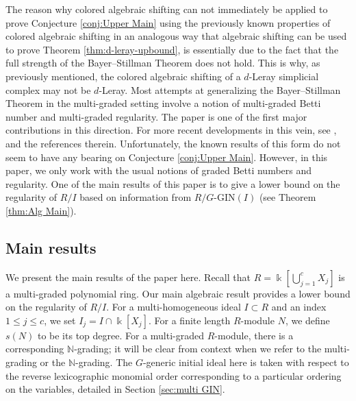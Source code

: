 \documentclass[a4paper, 10pt, reqno, english, ones]{amsart}  %
\theoremstyle{definition}
\theoremstyle{remark}
\begin{document}
The reason why colored algebraic shifting can not immediately be applied to prove Conjecture \ref{conj:Upper Main} using the previously known properties of colored algebraic shifting in an analogous way that algebraic shifting can be used to prove Theorem \ref{thm:d-leray-upbound}, is essentially due to the fact that the full strength of the Bayer--Stillman Theorem does not hold. This is why, as previously mentioned, the colored algebraic shifting of a $d$-Leray simplicial complex may not be $d$-Leray. Most attempts at generalizing the Bayer--Stillman Theorem in the multi-graded setting involve a notion of multi-graded Betti number and multi-graded regularity. The paper \cite{maclagan2004multigraded} is one of the first major contributions in this direction. For more recent developments in this vein, see \cite{bender2026bigraded}, and the references therein. Unfortunately, the known results of this form do not seem to have any bearing on Conjecture \ref{conj:Upper Main}.  However, in this paper, we only work with the usual notions of graded Betti numbers and regularity. One of the main results of this paper is to give a lower bound on the regularity of $R/I$ based on information from $R/G\textrm{-GIN}(I)$ (see Theorem \ref{thm:Alg Main}).

\subsection{Main results}

We present the main results of the paper here. Recall that $R=\Bbbk [\bigcup_{j=1}^c X_j]$ is a multi-graded polynomial ring. Our main algebraic result provides a lower bound on the regularity of $R/I$. For a multi-homogeneous ideal $I\subset R$ and an index $1\leq j\leq c$, we set $I_j=I\cap \Bbbk[X_j]$. For a finite length $R$-module $N$, we define $s(N)$ to be its top degree. For a multi-graded $R$-module, there is a corresponding $\mathbb{N}$-grading; it will be clear from context when we refer to the multi-grading or the $\mathbb{N}$-grading. The $G$-generic initial ideal here is taken with respect to the reverse lexicographic monomial order corresponding to a particular ordering on the variables, detailed in Section \ref{sec:multi GIN}.
\end{document}
